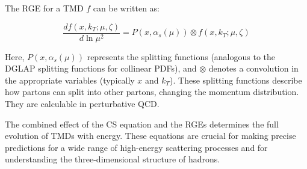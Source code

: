 \documentclass{article}
\begin{document}
The RGE for a TMD $f$ can be written as:

\begin{equation}
  \frac{d f(x, k_T; \mu, \zeta)}{d \ln \mu^2} = P(x, \alpha_s(\mu)) \otimes f(x, k_T; \mu, \zeta)
  \label{eq:RGE}
\end{equation}

Here, $P(x, \alpha_s(\mu))$ represents the splitting functions (analogous to the DGLAP splitting functions for collinear PDFs), and $\otimes$ denotes
a convolution in the appropriate variables (typically $x$ and $k_T$). These splitting functions describe how partons can split into other partons,
changing the momentum distribution. They are calculable in perturbative QCD.\@

The combined effect of the CS equation and the RGEs determines the full evolution of TMDs with energy. These equations are crucial for making precise
predictions for a wide range of high-energy scattering processes and for understanding the three-dimensional structure of hadrons.



\end{document}
